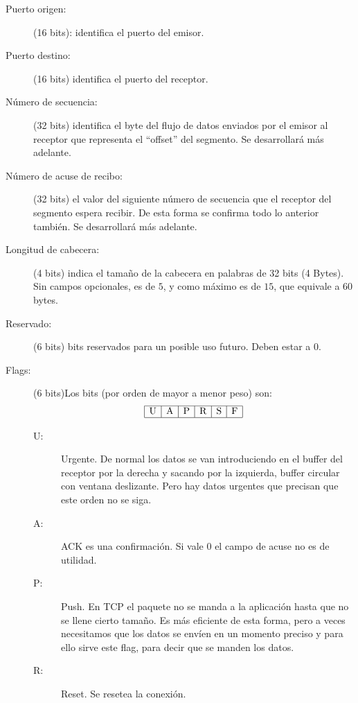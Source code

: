 \begin{description}
    \item [Puerto origen:] (16 bits): identifica el puerto del emisor.
    \item [Puerto destino:] (16 bits) identifica el puerto del receptor.
    \item [Número de secuencia:] (32 bits) identifica el byte del flujo de datos enviados por el emisor al receptor que representa el ``offset'' del segmento. Se desarrollará más adelante.
    \item [Número de acuse de recibo:] (32 bits) el valor del siguiente número de secuencia que el receptor del segmento espera recibir. De esta forma se confirma todo lo anterior también. Se desarrollará más adelante.
    \item [Longitud de cabecera:] (4 bits) indica el tamaño de la cabecera en palabras de 32 bits (4 Bytes). Sin campos opcionales, es de $5$, y como máximo es de $15$, que equivale a $60$ bytes.
    \item [Reservado: ] (6 bits) bits reservados para un posible uso futuro. Deben estar a $0$.
    \item [Flags: ] (6 bits)Los bits (por orden de mayor a menor peso) son:
        \begin{equation*}
            \begin{array}{|c|c|c|c|c|c|}
                \hline
                \text{U} & \text{A} & \text{P} & \text{R} & \text{S} & \text{F}\\
                \hline
            \end{array}
        \end{equation*}
        \begin{description}
            \item [U:] Urgente. De normal los datos se van introduciendo en el buffer del receptor por la derecha y sacando por la izquierda, buffer circular con ventana deslizante. Pero hay datos urgentes que precisan que este orden no se siga. 
            \item [A:] ACK es una confirmación. Si vale 0 el campo de acuse no es de utilidad.
            \item [P:] Push. En TCP el paquete no se manda a la aplicación hasta que no se llene cierto tamaño. Es más eficiente de esta forma, pero a veces necesitamos que los datos se envíen en un momento preciso y para ello sirve este flag, para decir que se manden los datos.
            \item [R:] Reset. Se resetea la conexión.

\end{description}
\end{description}
